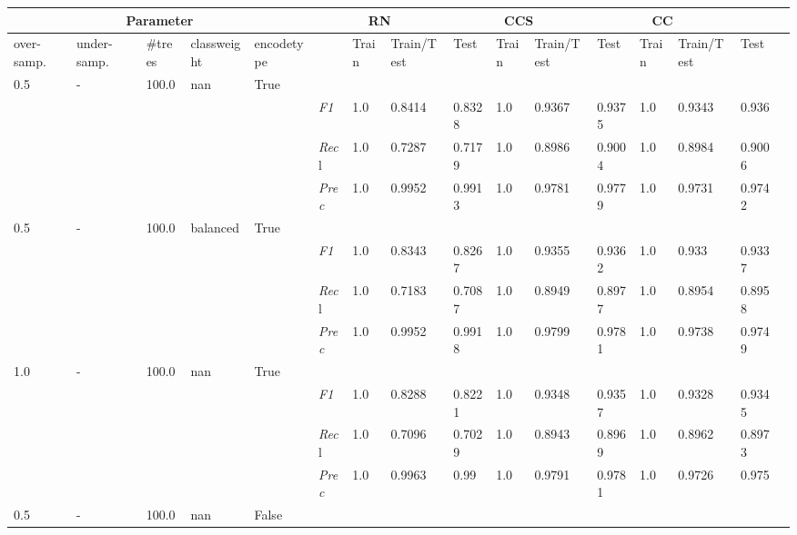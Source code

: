 \begin{table}[]
\tiny
\tabcolsep=0.11cm
\begin{tabularx}{\textwidth}{XXXXX|X|XXX|XXX|XXXX}
\toprule
\multicolumn{5}{c}{Parameter} & \multicolumn{3}{c}{RN} & \multicolumn{3}{c}{CCS} & \multicolumn{3}{c}{CC} \\ \midrule
over-\newline samp. & under-\newline samp. & \#trees & class\newline weight & encode\newline type & & Train & Train/\newline Test & Test & Train & Train/\newline Test & Test & Train & Train/\newline Test & Test \\ \midrule
0.5 & - & 100.0 & nan & True& & & & & & & & & \\
& & & & & \textit{F1} & 1.0 & 0.8414 & 0.8328 & 1.0 & 0.9367        & 0.9375        & 1.0        & 0.9343        & 0.936        \\
& & & & & \textit{Rec}l & 1.0 & 0.7287 & 0.7179    & 1.0 & 0.8986    & 0.9004    & 1.0    & 0.8984    & 0.9006    \\
& & & & & \textit{Prec} & 1.0 & 0.9952 & 0.9913 & 1.0 & 0.9781 & 0.9779 & 1.0 & 0.9731 & 0.9742 \\ \midrule
0.5 & - & 100.0 & balanced & True& & & & & & & & & \\
& & & & & \textit{F1} & 1.0 & 0.8343 & 0.8267 & 1.0 & 0.9355        & 0.9362        & 1.0        & 0.933        & 0.9337        \\
& & & & & \textit{Rec}l & 1.0 & 0.7183 & 0.7087    & 1.0 & 0.8949    & 0.8977    & 1.0    & 0.8954    & 0.8958    \\
& & & & & \textit{Prec} & 1.0 & 0.9952 & 0.9918 & 1.0 & 0.9799 & 0.9781 & 1.0 & 0.9738 & 0.9749 \\ \midrule
1.0 & - & 100.0 & nan & True& & & & & & & & & \\
& & & & & \textit{F1} & 1.0 & 0.8288 & 0.8221 & 1.0 & 0.9348        & 0.9357        & 1.0        & 0.9328        & 0.9345        \\
& & & & & \textit{Rec}l & 1.0 & 0.7096 & 0.7029    & 1.0 & 0.8943    & 0.8969    & 1.0    & 0.8962    & 0.8973    \\
& & & & & \textit{Prec} & 1.0 & 0.9963 & 0.99 & 1.0 & 0.9791 & 0.9781 & 1.0 & 0.9726 & 0.975 \\ \midrule
0.5 & - & 100.0 & nan & False& & & & & & & & & \\

\end{tabularx}
\end{table}

